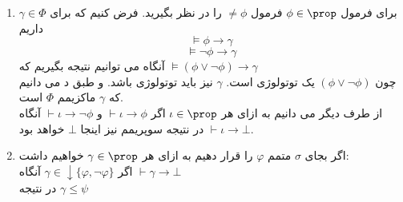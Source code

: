 \begin{ans}
\begin{enumerate}[label=(\alph*)]
        \item 
        برای فرمول 
        $\phi\in\prop$
        فرمول 
        $\neq\phi$
        را در نظر بگیرید. 
        فرض کنیم که برای 
        $\gamma\in\Phi$
        داریم 
        \[\models\phi\to\gamma\]
        \[\models\neg\phi\to\gamma\]
        آنگاه می توانیم نتیجه بگیریم که 
        $\models(\phi\vee\neg\phi)\to\gamma$
        \\
        چون 
        $(\phi\vee\neg\phi)$
        یک توتولوژی است. 
        $\gamma$
        نیز باید توتولوژی باشد. و طبق د می دانیم که 
        $\gamma$
        ماکزیمم
        $\Phi$
        است.
        \\
        از طرف دیگر می دانیم به ازای هر 
        $\iota\in\prop$
        اگر 
        $\vdash\iota\to\phi$
        و
        $\vdash\iota\to\neg\phi$
        آنگاه
        $\vdash\iota\to\bot$
        در نتیجه سوپریمم نیز اینجا 
        $\bot$
        خواهد بود.

        \item 
        اگر بجای
        $\sigma$
        متمم 
        $\varphi$
        را قرار دهیم به ازای هر 
        $\gamma\in\prop$
        خواهیم داشت:
        \\
        اگر 
        $\gamma\in\downarrow\{\varphi,\neg\varphi\}$
        آنگاه
        $\vdash\gamma\to\bot$
        \\
        در نتیجه 
        $\gamma\leq\psi$
    \end{enumerate}
\end{ans}
